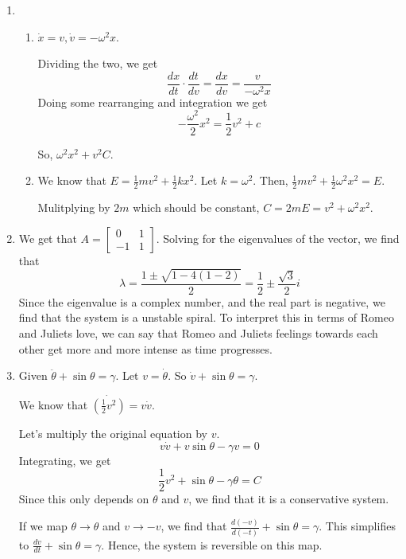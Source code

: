 \documentclass[12pt]{article}
\begin{document}

\begin{enumerate}[start=1,label={\bfseries Problem \arabic*:},leftmargin=1in] %
    \item 
    \begin{enumerate}
        \item $\dot{x} = v, \dot{v} = -\omega^{2}x$. 
        
        Dividing the two, we get 
        \[
            \frac{dx}{dt} \cdot \frac{dt}{dv} = \frac{dx}{dv} = \frac{v}{-\omega^{2}x}
        \]
        Doing some rearranging and integration we get 
        \[
            -\frac{\omega^{2}}{2}x^{2} = \frac{1}{2}v^{2} + c
        \]

        So, $\omega^{2}x^{2} + v^{2} C$.  

        \item We know that $E = \frac{1}{2}mv^{2} + \frac{1}{2}kx^{2}$. 
        Let $k = \omega^{2}$. Then, $\frac{1}{2}mv^{2} + \frac{1}{2}\omega^{2}x^{2} = E$. 
        
        Mulitplying by $2m$ which should be constant, $C = 2mE = v^{2} + \omega^{2}x^{2}$. 
    \end{enumerate}    

    \item We get that $A = \begin{bmatrix}
        0 & 1 \\ 
        -1 & 1
    \end{bmatrix}$. Solving for the eigenvalues of the vector, we find that 
    \[
        \lambda = \frac{1 \pm \sqrt{1 - 4(1-2)}}{2} = \frac{1}{2} \pm \frac{\sqrt{3}}{2}i
    \]
    Since the eigenvalue is a complex number, and the real part is negative, we find that the system is a unstable spiral. 
    To interpret this in terms of Romeo and Juliets love, we can say that Romeo and Juliets feelings towards each other get more and more intense as time progresses. 
    

    \item Given $\ddot{\theta} + \sin \theta = \gamma$. 
    Let $v = \dot{\theta}$. So $\dot{v} + \sin \theta = \gamma$. 

    We know that $\dot{(\frac{1}{2}v^2)} = v\dot{v}$. 

    Let's multiply the original equation by $v$. 
    \[ 
        v\dot{v} + v\sin\theta - \gamma v = 0
    \]
    Integrating, we get 
    \[ 
        \frac{1}{2}v^{2} + \sin \theta - \gamma \theta = C
    \]
    Since this only depends on $\theta$ and $v$, we find that it is a conservative system. 

    If we map $\theta \rightarrow \theta$ and $v \rightarrow -v$, we find that $\frac{d(-v)}{d(-t)} + \sin \theta = \gamma$. 
    This simplifies to $\frac{dv}{dt} + \sin \theta = \gamma $. Hence, the system is reversible on this map.
\end{enumerate}
\end{document}
